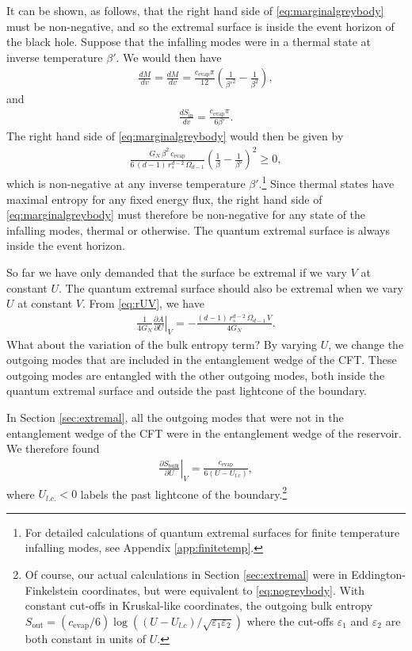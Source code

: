 \documentclass[11pt,a4paper]{article}
\begin{document}
It can be shown, as follows, that the right hand side of \eqref{eq:marginalgreybody} must be non-negative, and so the extremal surface is inside the event horizon of the black hole. Suppose that the infalling modes were in a thermal state at inverse temperature $\beta'$. We would then have
\begin{align}
\frac{dM}{dv} = \frac{d M}{d v} =\frac{c_\text{evap} \pi}{12} (\frac{1}{\beta'^2} - \frac{1}{\beta^2}),
\end{align}
and \cite{calabrese2004entanglement, calabrese2009entanglement}
\begin{align}
\frac{d S_\text{in}}{d v} = \frac{c_\text{evap} \pi}{6 \beta'}.
\end{align}
The right hand side of \eqref{eq:marginalgreybody} would then be given by 
\begin{align} \label{eq:positiverhs}
\frac{G_N \,\beta^2\,c_\text{evap}}{6\,(d-1)\, r_s^{d-2} \,\Omega_{d-1}}\left(\frac{1}{\beta} - \frac{1}{\beta'}\right)^2 \geq 0,
\end{align}
which is non-negative at any inverse temperature $\beta'$.\footnote{For detailed calculations of quantum extremal surfaces for finite temperature infalling modes, see Appendix \ref{app:finitetemp}.} Since thermal states have maximal entropy for any fixed energy flux, the right hand side of \eqref{eq:marginalgreybody} must therefore be non-negative for any state of the infalling modes, thermal or otherwise. The quantum extremal surface is always inside the event horizon.

So far we have only demanded that the surface be extremal if we vary $V$ at constant $U$. The quantum extremal surface should also be extremal when we vary $U$ at constant $V$. From \eqref{eq:rUV}, we have
\begin{align} \label{eq:dA/dU}
\frac{1}{4 G_N} \left. \frac{\partial A}{\partial U} \right|_V =  - \frac{(d-1)\, r_s^{d-2} \,\Omega_{d-1}\, V}{4 G_N}.
\end{align}
What about the variation of the bulk entropy term? By varying $U$, we change the outgoing modes that are included in the entanglement wedge of the CFT. These outgoing modes are entangled with the other outgoing modes, both inside the quantum extremal surface and outside the past lightcone of the boundary. 

In Section \ref{sec:extremal}, all the outgoing modes that were not in the entanglement wedge of the CFT were in the entanglement wedge of the reservoir. We therefore found
\begin{align} \label{eq:nogreybody}
\left. \frac{\partial S_\text{bulk}}{\partial U} \right|_V = \frac{c_\text{evap}}{6(U - U_{l.c})},
\end{align}
where $U_{l.c.} < 0$ labels the past lightcone of the boundary.\footnote{Of course, our actual calculations in Section \ref{sec:extremal} were in Eddington-Finkelstein coordinates, but were equivalent to \eqref{eq:nogreybody}. With constant cut-offs in Kruskal-like coordinates, the outgoing bulk entropy $S_\text{out} = (c_\text{evap}/ 6)\log((U - U_{l.c})/ \sqrt{\varepsilon_1 \varepsilon_2})$ where the cut-offs $\varepsilon_1$ and $\varepsilon_2$ are both constant in units of $U$.} 
\end{document}
